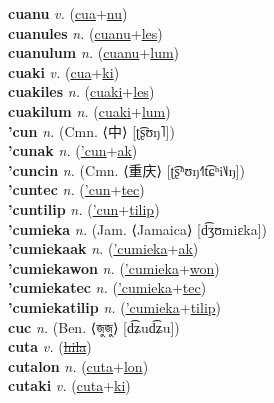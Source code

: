 \textbf{cuanu} \textit{v.} (\hyperref[cua]{cua}+\hyperref[nu]{nu})
 \label{cuanu} \\
\textbf{cuanules} \textit{n.} (\hyperref[cuanu]{cuanu}+\hyperref[les]{les})
 \label{cuanules} \\
\textbf{cuanulum} \textit{n.} (\hyperref[cuanu]{cuanu}+\hyperref[lum]{lum})
 \label{cuanulum} \\
\textbf{cuaki} \textit{v.} (\hyperref[cua]{cua}+\hyperref[ki]{ki})
 \label{cuaki} \\
\textbf{cuakiles} \textit{n.} (\hyperref[cuaki]{cuaki}+\hyperref[les]{les})
 \label{cuakiles} \\
\textbf{cuakilum} \textit{n.} (\hyperref[cuaki]{cuaki}+\hyperref[lum]{lum})
 \label{cuakilum} \\
\textbf{'cun} \textit{n.} (Cmn. ⟨中⟩ [ʈ͡ʂʊŋ˥])
 \label{'cun} \\
\textbf{'cunak} \textit{n.} (\hyperref['cun]{'cun}+\hyperref[ak]{ak})
 \label{'cunak} \\
\textbf{'cuncin} \textit{n.} (Cmn. ⟨重庆⟩ [ʈ͡ʂʰʊŋ˧˥t͡ɕʰi˥˩ŋ])
 \label{'cuncin} \\
\textbf{'cuntec} \textit{n.} (\hyperref['cun]{'cun}+\hyperref[tec]{tec})
 \label{'cuntec} \\
\textbf{'cuntilip} \textit{n.} (\hyperref['cun]{'cun}+\hyperref[tilip]{tilip})
 \label{'cuntilip} \\
\textbf{'cumieka} \textit{n.} (Jam. ⟨Jamaica⟩ [d͡ʒʊmiɛka])
 \label{'cumieka} \\
\textbf{'cumiekaak} \textit{n.} (\hyperref['cumieka]{'cumieka}+\hyperref[ak]{ak})
 \label{'cumiekaak} \\
\textbf{'cumiekawon} \textit{n.} (\hyperref['cumieka]{'cumieka}+\hyperref[won]{won})
 \label{'cumiekawon} \\
\textbf{'cumiekatec} \textit{n.} (\hyperref['cumieka]{'cumieka}+\hyperref[tec]{tec})
 \label{'cumiekatec} \\
\textbf{'cumiekatilip} \textit{n.} (\hyperref['cumieka]{'cumieka}+\hyperref[tilip]{tilip})
 \label{'cumiekatilip} \\
\textbf{cuc} \textit{n.} (Ben. ⟨জুজু⟩ [d͡ʑud͡ʑu])
 \label{cuc} \\
\textbf{cuta} \textit{v.} (\hyperref[hila]{\sout{hila}})
 \label{cuta} \\
\textbf{cutalon} \textit{n.} (\hyperref[cuta]{cuta}+\hyperref[lon]{lon})
 \label{cutalon} \\
\textbf{cutaki} \textit{v.} (\hyperref[cuta]{cuta}+\hyperref[ki]{ki})
 \label{cutaki} \\
